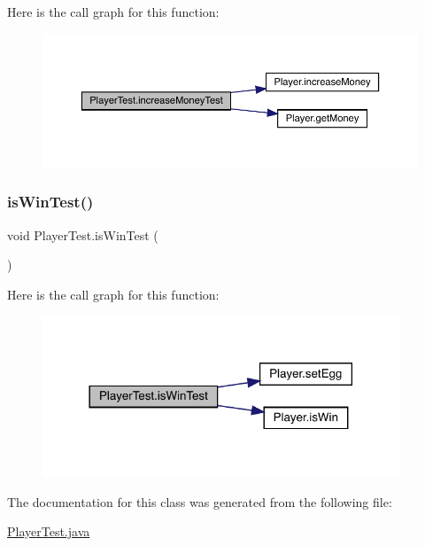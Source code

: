 Here is the call graph for this function\+:
\nopagebreak
\begin{figure}[H]
\begin{center}
\leavevmode
\includegraphics[width=350pt]{class_player_test_a7e9437588b95b9b7cf2f34af9c594291_cgraph}
\end{center}
\end{figure}
\mbox{\label{class_player_test_aae082a51594249a5cc09a8e4d50c826c}} 
\subsubsection{\texorpdfstring{is\+Win\+Test()}{isWinTest()}}
{\footnotesize\ttfamily void Player\+Test.\+is\+Win\+Test (\begin{DoxyParamCaption}{ }\end{DoxyParamCaption})\hspace{0.3cm}{\ttfamily [inline]}}

Here is the call graph for this function\+:
\nopagebreak
\begin{figure}[H]
\begin{center}
\leavevmode
\includegraphics[width=302pt]{class_player_test_aae082a51594249a5cc09a8e4d50c826c_cgraph}
\end{center}
\end{figure}


The documentation for this class was generated from the following file\+:\begin{DoxyCompactItemize}
\item 
\mbox{\hyperlink{_player_test_8java}{Player\+Test.\+java}}\end{DoxyCompactItemize}
